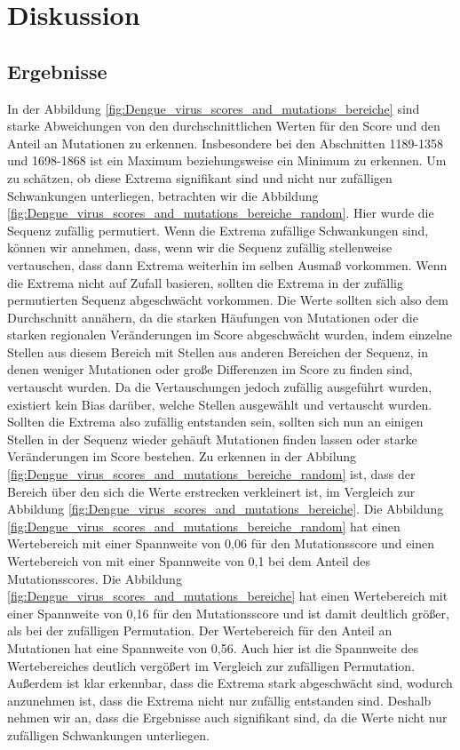 \documentclass[german,version-2022-01]{uzl-thesis}
\begin{document}
\chapter{Diskussion}
\section{Ergebnisse}
In der Abbildung \ref{fig:Dengue_virus_scores_and_mutations_bereiche} sind starke Abweichungen von den durchschnittlichen Werten f\"ur den Score und den Anteil an Mutationen zu erkennen. Insbesondere bei den Abschnitten 1189-1358 und 1698-1868 ist ein Maximum beziehungsweise ein Minimum zu erkennen. Um zu sch\"atzen, ob diese Extrema signifikant sind und nicht nur zuf\"alligen Schwankungen unterliegen, betrachten wir die Abbildung \ref{fig:Dengue_virus_scores_and_mutations_bereiche_random}. Hier wurde die Sequenz zuf\"allig permutiert. Wenn die Extrema zuf\"allige Schwankungen sind, k\"onnen wir annehmen, dass, wenn wir die Sequenz zuf\"allig stellenweise vertauschen, dass dann Extrema weiterhin im selben Ausma\ss{} vorkommen. Wenn die Extrema nicht auf Zufall basieren, sollten die Extrema in der zuf\"allig permutierten Sequenz abgeschw\"acht vorkommen. Die Werte sollten sich also dem Durchschnitt ann\"ahern, da die starken H\"aufungen von Mutationen oder die starken regionalen Ver\"anderungen im Score abgeschw\"acht wurden, indem einzelne Stellen aus diesem Bereich mit Stellen aus anderen Bereichen der Sequenz, in denen weniger Mutationen oder gro\ss{}e Differenzen im Score zu finden sind, vertauscht wurden. Da die Vertauschungen jedoch zuf\"allig ausgef\"uhrt wurden, existiert kein Bias dar\"uber, welche Stellen ausgew\"ahlt und vertauscht wurden. Sollten die Extrema also zuf\"allig entstanden sein, sollten sich nun an einigen Stellen in der Sequenz wieder geh\"auft Mutationen finden lassen oder starke Ver\"anderungen im Score bestehen. 
Zu erkennen in der Abbilung \ref{fig:Dengue_virus_scores_and_mutations_bereiche_random} ist, dass der Bereich \"uber den sich die Werte erstrecken verkleinert ist, im Vergleich zur Abbildung \ref{fig:Dengue_virus_scores_and_mutations_bereiche}. Die Abbildung \ref{fig:Dengue_virus_scores_and_mutations_bereiche_random} hat einen Wertebereich mit einer Spannweite von 0,06 f\"ur den Mutationsscore und einen Wertebereich von mit einer Spannweite von 0,1 bei dem Anteil des Mutationsscores. Die Abbildung \ref{fig:Dengue_virus_scores_and_mutations_bereiche} hat einen Wertebereich mit einer Spannweite von 0,16 f\"ur den Mutationsscore und ist damit deultlich gr\"o\ss{}er, als bei der zuf\"alligen Permutation. Der Wertebereich f\"ur den Anteil an Mutationen hat eine Spannweite von 0,56. Auch hier ist die Spannweite des Wertebereiches deutlich verg\"o\ss{}ert im Vergleich zur zuf\"alligen Permutation. Au\ss{}erdem ist klar erkennbar, dass die Extrema stark abgeschw\"acht sind, wodurch anzunehmen ist, dass die Extrema nicht nur zuf\"allig entstanden sind. Deshalb nehmen wir an, dass die Ergebnisse auch signifikant sind, da die Werte nicht nur zuf\"alligen Schwankungen unterliegen.  
\end{document}

